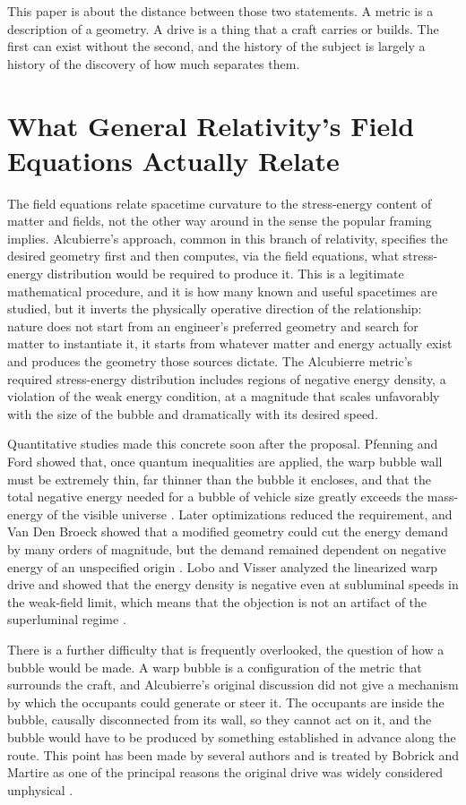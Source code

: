 \documentclass[11pt]{article}
\begin{document}
This paper is about the distance between those two statements. A metric is a description of a geometry. A drive is a thing that a craft carries or builds. The first can exist without the second, and the history of the subject is largely a history of the discovery of how much separates them.

\section{What General Relativity's Field Equations Actually Relate}

The field equations relate spacetime curvature to the stress-energy content of matter and fields, not the other way around in the sense the popular framing implies. Alcubierre's approach, common in this branch of relativity, specifies the desired geometry first and then computes, via the field equations, what stress-energy distribution would be required to produce it. This is a legitimate mathematical procedure, and it is how many known and useful spacetimes are studied, but it inverts the physically operative direction of the relationship: nature does not start from an engineer's preferred geometry and search for matter to instantiate it, it starts from whatever matter and energy actually exist and produces the geometry those sources dictate. The Alcubierre metric's required stress-energy distribution includes regions of negative energy density, a violation of the weak energy condition, at a magnitude that scales unfavorably with the size of the bubble and dramatically with its desired speed.

Quantitative studies made this concrete soon after the proposal. Pfenning and Ford showed that, once quantum inequalities are applied, the warp bubble wall must be extremely thin, far thinner than the bubble it encloses, and that the total negative energy needed for a bubble of vehicle size greatly exceeds the mass-energy of the visible universe \cite{PF1997}. Later optimizations reduced the requirement, and Van Den Broeck showed that a modified geometry could cut the energy demand by many orders of magnitude, but the demand remained dependent on negative energy of an unspecified origin \cite{VDB1999}. Lobo and Visser analyzed the linearized warp drive and showed that the energy density is negative even at subluminal speeds in the weak-field limit, which means that the objection is not an artifact of the superluminal regime \cite{LV2004}.

There is a further difficulty that is frequently overlooked, the question of how a bubble would be made. A warp bubble is a configuration of the metric that surrounds the craft, and Alcubierre's original discussion did not give a mechanism by which the occupants could generate or steer it. The occupants are inside the bubble, causally disconnected from its wall, so they cannot act on it, and the bubble would have to be produced by something established in advance along the route. This point has been made by several authors and is treated by Bobrick and Martire as one of the principal reasons the original drive was widely considered unphysical \cite{BM2021}.
\end{document}
